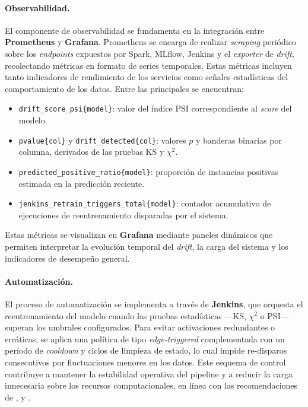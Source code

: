 \paragraph{Observabilidad.}  
El componente de observabilidad se fundamenta en la integración entre \textbf{Prometheus} y \textbf{Grafana}.  
Prometheus se encarga de realizar \textit{scraping} periódico sobre los \textit{endpoints} expuestos por Spark, MLflow, Jenkins y el \textit{exporter} de \textit{drift}, recolectando métricas en formato de series temporales.  
Estas métricas incluyen tanto indicadores de rendimiento de los servicios como señales estadísticas del comportamiento de los datos. Entre las principales se encuentran:
\begin{itemize}\setlength\itemsep{2pt}
  \item \texttt{drift\_score\_psi\{model\}}: valor del índice $\mathrm{PSI}$ correspondiente al \textit{score} del modelo.
  \item \texttt{pvalue\{col\}} y \texttt{drift\_detected\{col\}}: valores $p$ y banderas binarias por columna, derivados de las pruebas KS y $\chi^2$.
  \item \texttt{predicted\_positive\_ratio\{model\}}: proporción de instancias positivas estimada en la predicción reciente.
  \item \texttt{jenkins\_retrain\_triggers\_total\{model\}}: contador acumulativo de ejecuciones de reentrenamiento disparadas por el sistema.
\end{itemize}
Estas métricas se visualizan en \textbf{Grafana} mediante paneles dinámicos que permiten interpretar la evolución temporal del \textit{drift}, la carga del sistema y los indicadores de desempeño general.

\paragraph{Automatización.}  
El proceso de automatización se implementa a través de \textbf{Jenkins}, que orquesta el reentrenamiento del modelo cuando las pruebas estadísticas —KS, $\chi^2$ o PSI— superan los umbrales configurados.  
Para evitar activaciones redundantes o erráticas, se aplica una política de tipo \textit{edge-triggered} complementada con un período de \textit{cooldown} y ciclos de limpieza de estado, lo cual impide re-disparos consecutivos por fluctuaciones menores en los datos.  
Este esquema de control contribuye a mantener la estabilidad operativa del pipeline y a reducir la carga innecesaria sobre los recursos computacionales, en línea con las recomendaciones de \citet{Kim2018}, \citet{Kahn2020} y \citet{RodriguezSimmhan2023}.



